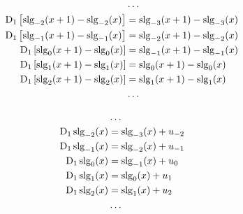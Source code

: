 \begin{equation*} \begin{aligned}
&\ldots
\\
\mathrm{D}_1 \left[\operatorname{slg}_{-2}(x + 1) - \operatorname{slg}_{-2}(x) \right] &= \operatorname{slg}_{-3}(x + 1) - \operatorname{slg}_{-3}(x)  
\\
\mathrm{D}_1 \left[\operatorname{slg}_{-1}(x + 1) - \operatorname{slg}_{-1}(x) \right] &= \operatorname{slg}_{-2}(x + 1) - \operatorname{slg}_{-2}(x)  
\\
\mathrm{D}_1 \left[\operatorname{slg}_0(x + 1) - \operatorname{slg}_0(x) \right] &= \operatorname{slg}_{-1}(x + 1) - \operatorname{slg}_{-1}(x)  
\\
\mathrm{D}_1 \left[\operatorname{slg}_1(x + 1) - \operatorname{slg}_1(x) \right] &= \operatorname{slg}_0(x + 1) - \operatorname{slg}_0(x)  
\\
\mathrm{D}_1 \left[\operatorname{slg}_2(x + 1) - \operatorname{slg}_2(x) \right] &= \operatorname{slg}_1(x + 1) - \operatorname{slg}_1(x)  
\\
&\ldots
\\
\end{aligned} \end{equation*}

\begin{equation*} \begin{aligned}
&\ldots
\\
\mathrm{D}_1 \operatorname{slg}_{-2}(x) &= \operatorname{slg}_{-3}(x) + u_{-2}  
\\
\mathrm{D}_1 \operatorname{slg}_{-1}(x) &= \operatorname{slg}_{-2}(x) + u_{-1}  
\\
\mathrm{D}_1 \operatorname{slg}_0(x) &= \operatorname{slg}_{-1}(x) + u_0  
\\
\mathrm{D}_1 \operatorname{slg}_1(x) &= \operatorname{slg}_0(x) + u_1  
\\
\mathrm{D}_1 \operatorname{slg}_2(x) &= \operatorname{slg}_1(x) + u_2
\\
&\ldots
\\
\end{aligned} \end{equation*}